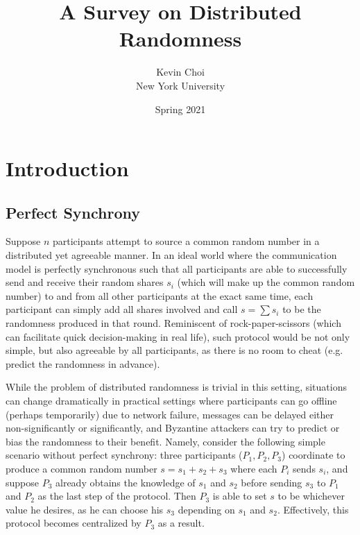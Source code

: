 \documentclass[letterpaper,twocolumn,10pt]{article}
\title{\Large \bf A Survey on Distributed Randomness}
\author{
{\rm Kevin Choi}\\
New York University
}
\date{Spring 2021}
\theoremstyle{definition}
\theoremstyle{remark}
\begin{document}
\maketitle
\tableofcontents
\pagebreak

\section{Introduction}
\subsection{Perfect Synchrony}
Suppose $n$ participants attempt to source a common random number in a distributed yet agreeable manner. In an ideal world where the communication model is perfectly synchronous such that all participants are able to successfully send and receive their random shares $s_i$ (which will make up the common random number) to and from all other participants at the exact same time, each participant can simply add all shares involved and call $s = \sum s_i$ to be the randomness produced in that round. Reminiscent of rock-paper-scissors (which can facilitate quick decision-making in real life), such protocol would be not only simple, but also agreeable by all participants, as there is no room to cheat (e.g. predict the randomness in advance).

While the problem of distributed randomness is trivial in this setting, situations can change dramatically in practical settings where participants can go offline (perhaps temporarily) due to network failure, messages can be delayed either non-significantly or significantly, and Byzantine attackers can try to predict or bias the randomness to their benefit. Namely, consider the following simple scenario without perfect synchrony: three participants ($P_1, P_2, P_3$) coordinate to produce a common random number $s = s_1 + s_2 + s_3$ where each $P_i$ sends $s_i$, and suppose $P_3$ already obtains the knowledge of $s_1$ and $s_2$ before sending $s_3$ to $P_1$ and $P_2$ as the last step of the protocol. Then $P_3$ is able to set $s$ to be whichever value he desires, as he can choose his $s_3$ depending on $s_1$ and $s_2$. Effectively, this protocol becomes centralized by $P_3$ as a result.
\end{document}
